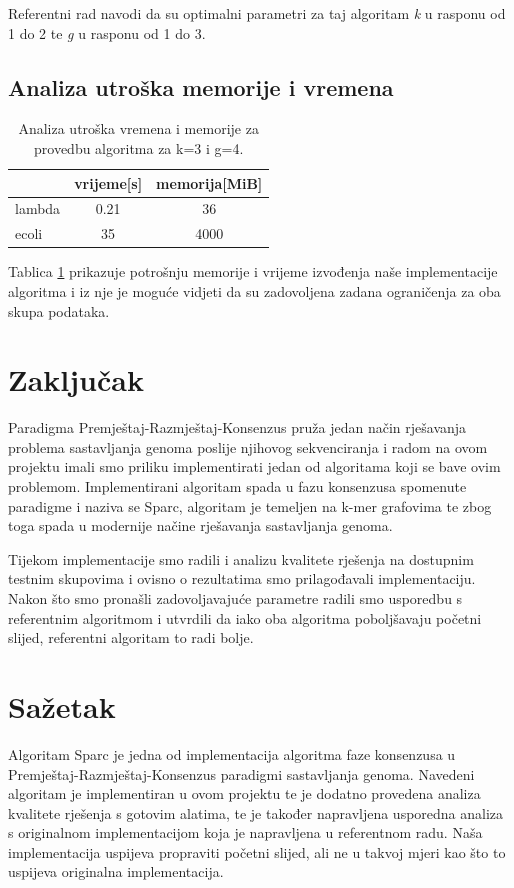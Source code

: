 \documentclass[times, utf8, seminar, numeric]{fer}
\begin{document}
Referentni rad navodi da su optimalni parametri za taj algoritam \emph{k} u rasponu od 1 do 2 te \emph{g} u rasponu od 1 do 3. 

\section{Analiza utroška memorije i vremena}
\begin{table}[htb]
	\centering
	\begin{tabular}{l|cc}
		& \multicolumn{1}{l}{vrijeme[s]} & memorija[MiB] \\ 	\hline
		lambda			& 0.21		& 36 	\\ 	\hline
		ecoli  			& 35     	& 4000  \\	\hline
	\end{tabular}
	\caption{Analiza utroška vremena i memorije za provedbu algoritma za k=3 i g=4.}
	\label{table:memorija}
\end{table}

Tablica \ref{table:memorija} prikazuje potrošnju memorije i vrijeme izvođenja naše implementacije algoritma i iz nje je moguće vidjeti da su zadovoljena zadana ograničenja za oba skupa podataka. 


\chapter{Zaključak}
Paradigma Premještaj-Razmještaj-Konsenzus pruža jedan način rješavanja problema sastavljanja genoma poslije njihovog sekvenciranja i radom na ovom projektu imali smo priliku implementirati jedan od algoritama koji se bave ovim problemom. Implementirani algoritam spada u fazu konsenzusa spomenute paradigme i naziva se Sparc, algoritam je temeljen na k-mer grafovima te zbog toga spada u modernije načine rješavanja sastavljanja genoma.

Tijekom implementacije smo radili i analizu kvalitete rješenja na dostupnim testnim skupovima i ovisno o rezultatima smo prilagođavali implementaciju. Nakon što smo pronašli zadovoljavajuće parametre radili smo usporedbu s referentnim algoritmom i utvrdili da iako oba algoritma poboljšavaju početni slijed, referentni algoritam to radi bolje.



\nocite{*}


\chapter{Sažetak}
Algoritam Sparc je jedna od implementacija algoritma faze konsenzusa u Premještaj-Razmještaj-Konsenzus paradigmi sastavljanja genoma. 
Navedeni algoritam je implementiran u ovom projektu te je dodatno provedena analiza kvalitete rješenja s gotovim alatima, te je također napravljena usporedna analiza s originalnom implementacijom koja je napravljena u referentnom radu. Naša implementacija uspijeva propraviti početni slijed, ali ne u takvoj mjeri kao što to uspijeva originalna implementacija.
\end{document}
